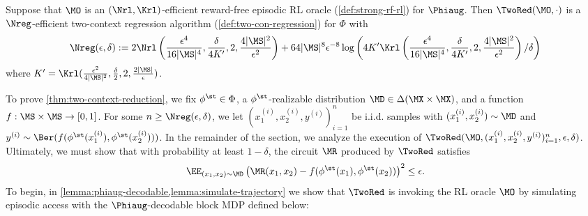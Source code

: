 \begin{theorem}\label{thm:two-context-reduction}
Suppose that $\MO$ is an $(\Nrl,\Krl)$-efficient reward-free episodic RL oracle (\cref{def:strong-rf-rl}) for $\Phiaug$. Then $\TwoRed(\MO,\cdot)$ is a $\Nreg$-efficient two-context regression algorithm (\cref{def:two-con-regression}) for $\Phi$ with
\[\Nreg(\epsilon,\delta) := 2\Nrl\left(\frac{\epsilon^4}{16|\MS|^4},\frac{\delta}{4K'},2,\frac{4|\MS|^2}{\epsilon^2}\right) + 64|\MS|^8\epsilon^{-8}\log\left(4K'\Krl\left(\frac{\epsilon^4}{16|\MS|^4},\frac{\delta}{4K'},2,\frac{4|\MS|^2}{\epsilon^2}\right)/\delta\right) \]
where $K' = \Krl(\frac{\epsilon^2}{4|\MS|^2},\frac{\delta}{2},2,\frac{2|\MS|}{\epsilon})$.
\end{theorem}

To prove \cref{thm:two-context-reduction}, we fix $\phi^\st \in \Phi$, a $\phi^\st$-realizable distribution $\MD \in \Delta(\MX\times\MX)$, and a function $f:\MS \times \MS \to [0,1]$. For some $n \geq \Nreg(\epsilon,\delta)$, we let $(x_1^{(i)}, x_2^{(i)},y^{(i)})_{i=1}^n$ be i.i.d. samples with $(x_1^{(i)},x_2^{(i)}) \sim \MD$ and $y^{(i)} \sim \Ber(f(\phi^\st(x_1^{(i)}),\phi^\st(x_2^{(i)})))$. In the remainder of the section, we analyze the execution of $\TwoRed(\MO,(x_1^{(i)}, x_2^{(i)},y^{(i)})_{i=1}^n,\epsilon,\delta)$. Ultimately, we must show that with probability at least $1-\delta$, the circuit $\MR$ produced by $\TwoRed$ satisfies 
\begin{equation} \EE_{(x_1,x_2) \sim \MD} \left(\MR(x_1,x_2) - f(\phi^\st(x_1),\phi^\st(x_2))\right)^2 \leq \epsilon.
\label{eq:twored-error-guarantee}
\end{equation}
To begin, in \cref{lemma:phiaug-decodable,lemma:simulate-trajectory} we show that $\TwoRed$ is invoking the RL oracle $\MO$ by simulating episodic access with the $\Phiaug$-decodable block MDP defined below:

